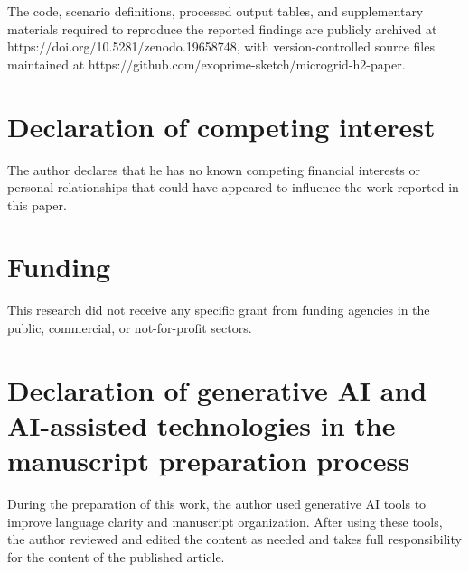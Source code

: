 \documentclass[preprint,12pt]{elsarticle}
\begin{document}
The code, scenario definitions, processed output tables, and supplementary materials required to reproduce the reported findings are publicly archived at https://doi.org/10.5281/zenodo.19658748, with version-controlled source files maintained at https://github.com/exoprime-sketch/microgrid-h2-paper.

\section*{Declaration of competing interest}

The author declares that he has no known competing financial interests or personal relationships that could have appeared to influence the work reported in this paper.

\section*{Funding}

This research did not receive any specific grant from funding agencies in the public, commercial, or not-for-profit sectors.

\section*{Declaration of generative AI and AI-assisted technologies in the manuscript preparation process}

During the preparation of this work, the author used generative AI tools to improve language clarity and manuscript organization. After using these tools, the author reviewed and edited the content as needed and takes full responsibility for the content of the published article.



\end{document}
